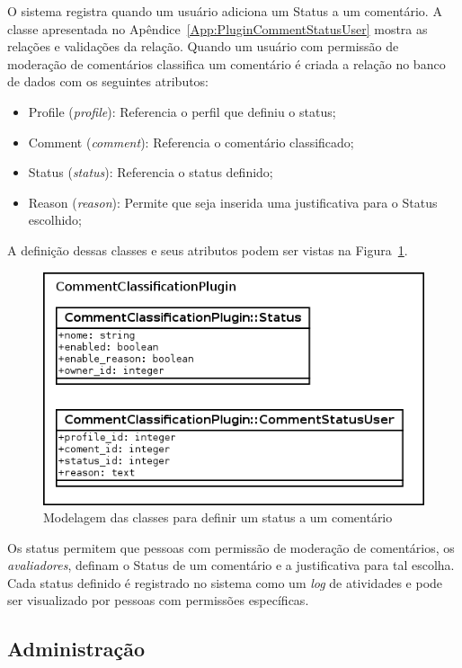 \documentclass[11pt]{article}
\begin{document}
O sistema registra quando um usuário adiciona um Status a um
comentário. A classe apresentada no
Apêndice~\ref{App:PluginCommentStatusUser} mostra as relações e
validações da relação. Quando um usuário com permissão de moderação de
comentários classifica um comentário é criada a relação no banco de
dados com os seguintes atributos:
\begin{itemize}
  \item Profile ({\it profile}): Referencia o perfil que definiu o
status;
  \item Comment ({\it comment}): Referencia o comentário classificado;
  \item Status ({\it status}): Referencia o status definido;
  \item Reason ({\it reason}): Permite que seja inserida uma
justificativa para o Status escolhido;
\end{itemize}

A definição dessas classes e seus atributos podem ser vistas na
Figura~\ref{fig:status-model}.

\begin{figure}[h]
\center
\includegraphics[scale=0.5]{status-model.png}
\caption{Modelagem das classes para definir um status a um comentário}
\label{fig:status-model}
\end{figure}

Os status permitem que pessoas com permissão de moderação de
comentários, os {\it avaliadores}, definam o Status de um comentário e a
justificativa para tal escolha. Cada status definido é registrado no
sistema como um {\it log} de atividades e pode ser visualizado por
pessoas com permissões específicas.

\subsection{Administração}
\end{document}
